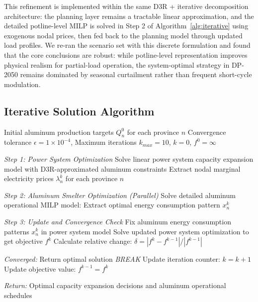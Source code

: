 \documentclass[preprint,12pt]{elsarticle}
\begin{document}
This refinement is implemented within the same D3R + iterative decomposition architecture: the planning layer remains a tractable linear approximation, and the detailed potline-level MILP is solved in Step 2 of Algorithm~\ref{alg:iterative} using exogenous nodal prices, then fed back to the planning model through updated load profiles. We re-ran the scenario set with this discrete formulation and found that the core conclusions are robust: while potline-level representation improves physical realism for partial-load operation, the system-optimal strategy in DP-2050 remains dominated by seasonal curtailment rather than frequent short-cycle modulation.

\subsection{Iterative Solution Algorithm}

\begin{algorithm}[H]
  \caption{Iterative Optimization Algorithm for Aluminum Smelter Integration}
  \label{alg:iterative}
  \begin{algorithmic}[1]
  \REQUIRE Initial aluminum production targets $Q_n^0$ for each province $n$
  \REQUIRE Convergence tolerance $\epsilon = 1 \times 10^{-4}$, Maximum iterations $k_{max} = 10$, $k = 0$, $f^0 = \infty$
  
      \STATE \textit{Step 1: Power System Optimization}
      \STATE Solve linear power system capacity expansion model with D3R-approximated aluminum constraints
      \STATE Extract nodal marginal electricity prices $\lambda_n^k$ for each province $n$
      
      \STATE \textit{Step 2: Aluminum Smelter Optimization (Parallel)}
          \STATE Solve detailed aluminum operational MILP model:
          \STATE Extract optimal energy consumption pattern $x_n^k$
      \ENDFOR
      
      \STATE \textit{Step 3: Update and Convergence Check}
      \STATE Fix aluminum energy consumption patterns $x_n^k$ in power system model
      \STATE Solve updated power system optimization to get objective $f^k$
      \STATE Calculate relative change: $\delta = |f^k - f^{k-1}| / |f^{k-1}|$
      
      \IF{$\delta < \epsilon$}
          \STATE \textit{Converged:} Return optimal solution
          \STATE \textit{BREAK}
      \ELSE
          \STATE Update iteration counter: $k = k + 1$
          \STATE Update objective value: $f^{k-1} = f^k$
      \ENDIF
  \ENDWHILE
  
  \STATE \textit{Return:} Optimal capacity expansion decisions and aluminum operational schedules
  \end{algorithmic}
  \end{algorithm}
\end{document}
